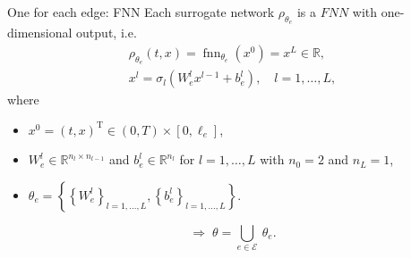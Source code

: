 \documentclass[9pt]{beamer}
\begin{document}
\begin{frame}{One for each edge: FNN}
    Each surrogate network $\rho_{\theta_e}$ is a $FNN$ with one-dimensional output, i.e. \\ 
    \begin{equation*} 
        \begin{gathered}
            \rho_{\theta_e} \left(t, x \right) = \operatorname{fnn}_{\theta_e} \left( x^0 \right) = x^L \in \mathbb{R}, \\
            x^l = \sigma_l \left(W^l_e x^{l-1} + b^{l}_e\right), \quad l = 1, \ldots, L,
        \end{gathered} 
    \end{equation*} 
    where \\
    \begin{itemize}
        \item $x^0 = \left(t, x\right)^{\mathrm{T}} \in \left(0, T\right) \times \left[0, \ell_e\right]$,
        \item $W^l_e \in \mathbb{R}^{n_l \times n_{l-1}}$ and $b^l_e \in \mathbb{R}^{n_l}$ for $l = 1, \ldots, L$ with $n_0 = 2$ and $n_L = 1$,
        \item $\theta_e = \left\{ \left\{ W^l_e \right\}_{l = 1, \ldots, L}, \left\{ b^l_e \right\}_{l = 1, \ldots, L} \right\}$.
    \end{itemize}
    \vspace{5mm}

    \begin{equation*}
        \Rightarrow \; \theta = \bigcup_{e \in \mathcal{E}} \ \theta_e.
    \end{equation*}
    
\end{frame}
\end{document}
